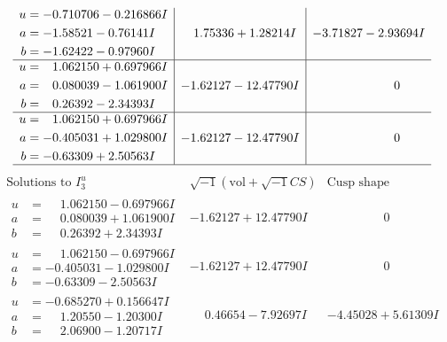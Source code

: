 \documentclass[1p]{elsarticle_modified}
\theoremstyle{definition}
\newcommand{\I}{\sqrt{-1}}
\begin{document}
$$\begin{array}{c|c|c}
\begin{aligned}
u &= -0.710706 - 0.216866 I \\
a &= -1.58521 - 0.76141 I \\
b &= -1.62422 - 0.97960 I\end{aligned}
 & \phantom{-}1.75336 + 1.28214 I & -3.71827 - 2.93694 I \\ \hline\begin{aligned}
u &= \phantom{-}1.062150 + 0.697966 I \\
a &= \phantom{-}0.080039 - 1.061900 I \\
b &= \phantom{-}0.26392 - 2.34393 I\end{aligned}
 & -1.62127 - 12.47790 I & \phantom{-0.000000 } 0 \\ \hline\begin{aligned}
u &= \phantom{-}1.062150 + 0.697966 I \\
a &= -0.405031 + 1.029800 I \\
b &= -0.63309 + 2.50563 I\end{aligned}
 & -1.62127 - 12.47790 I & \phantom{-0.000000 } 0\\
 \hline 
 \end{array}$$\newpage$$\begin{array}{c|c|c}  
\text{Solutions to }I^u_{3}& \I (\text{vol} + \sqrt{-1}CS) & \text{Cusp shape}\\
 \hline 
\begin{aligned}
u &= \phantom{-}1.062150 - 0.697966 I \\
a &= \phantom{-}0.080039 + 1.061900 I \\
b &= \phantom{-}0.26392 + 2.34393 I\end{aligned}
 & -1.62127 + 12.47790 I & \phantom{-0.000000 } 0 \\ \hline\begin{aligned}
u &= \phantom{-}1.062150 - 0.697966 I \\
a &= -0.405031 - 1.029800 I \\
b &= -0.63309 - 2.50563 I\end{aligned}
 & -1.62127 + 12.47790 I & \phantom{-0.000000 } 0 \\ \hline\begin{aligned}
u &= -0.685270 + 0.156647 I \\
a &= \phantom{-}1.20550 - 1.20300 I \\
b &= \phantom{-}2.06900 - 1.20717 I\end{aligned}
 & \phantom{-}0.46654 - 7.92697 I & -4.45028 + 5.61309 I \\ \hline\begin{aligned}

\end{aligned}
\end{array}$$
\end{document}
